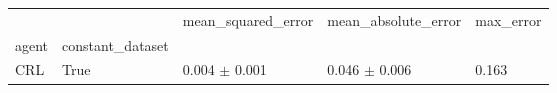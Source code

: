 \begin{tabular}{lllll}
\toprule
 &  & mean_squared_error & mean_absolute_error & max_error \\
agent & constant_dataset &  &  &  \\
\midrule
CRL & True & 0.004 $\pm$ 0.001 & 0.046 $\pm$ 0.006 & 0.163 \\
\cline{1-5}
\bottomrule
\end{tabular}
